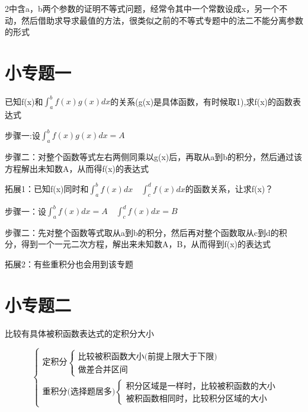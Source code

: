 \documentclass[a4paper,11pt]{book}
\begin{document}
\vspace{2ex}

2中含a，b两个参数的证明不等式问题，经常令其中一个常数设成x，另一个不动，然后借助求导求最值的方法，很类似之前的不等式专题中的法二不能分离参数的形式

\section*{小专题一}

已知f(x)和$\int_{a}^{b} f(x) g(x) d x$的关系(g(x)是具体函数，有时候取1),求f(x)的函数表达式

步骤一:设$\int_{a}^{b} f(x) g(x) d x=A$

步骤二：对整个函数等式左右两侧同乘以g(x)后，再取从a到b的积分，然后通过该方程解出未知数A，从而得f(x)的表达式

\vspace{2ex}

\noindent 拓展1：已知f(x)同时和$\int _{a}^{b}f(x)d x \quad \int _{c}^{d}f(x)dx$的函数关系，让求f(x)？

步骤一：设$\int _{a}^{b}f(x)dx=A \quad \int _{c}^{d}f(x)dx=B$

步骤二：先对整个函数等式取从a到b的积分，然后再对整个函数取从c到d的积分，得到一个一元二次方程，解出来未知数A，B，从而得到f(x)的表达式

\vspace{2ex}

\noindent 拓展2：有些重积分也会用到该专题

\section*{小专题二}

比较有具体被积函数表达式的定积分大小

\[
\text{\ }    
\begin{cases}
    \text{定积分}
        \begin{cases}
            \text{比较被积函数大小(前提上限大于下限)}\\
            \text{做差合并区间}
        \end{cases}\\
    \text{重积分(选择题居多)}
        \begin{cases}
            \text{积分区域是一样时，比较被积函数的大小}\\
            \text{被积函数相同时，比较积分区域的大小}
        \end{cases}
\end{cases}
\]
\end{document}
